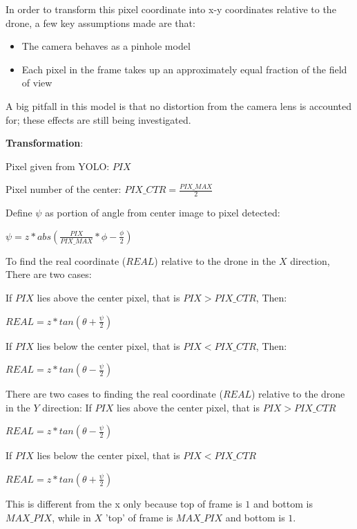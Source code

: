 \documentclass[12pt,letterpaper]{article}
\newcommand\tab[1][1cm]{\hspace*{#1}}
\begin{document}
			\begin{spacing}{.2}
			In order to transform this pixel coordinate into x-y coordinates relative to the drone, a few key assumptions made are that:

				\begin{itemize}
					\item The camera behaves as a pinhole model
					\item Each pixel in the frame takes up an approximately equal fraction of the field of view
				\end{itemize}

			A big pitfall in this model is that no distortion from the camera lens is accounted for; these effects are still being investigated.

				\textbf{Transformation}:

				Pixel given from YOLO: $PIX$ 


				\begin{center}
					Pixel number of the center: $PIX\_CTR = \frac{PIX\_MAX}{2}$
				\end{center}

				Define $\psi$ as portion of angle from center image to pixel detected:

				\begin{center}
					$\psi = z * abs(\frac{PIX}{PIX\_MAX} * \phi - \frac{\phi}{2})$
				\end{center}

				To find the real coordinate ($REAL$) relative to the drone in the $X$ direction, There are two cases:

						\tab If $PIX$ lies above the center pixel, that is $PIX > PIX\_CTR$, Then:
						\begin{center}
							$REAL = z * tan(\theta + \frac{\psi}{2})$
						\end{center}
						\tab If $PIX$ lies below the center pixel, that is $PIX < PIX\_CTR$, Then:
						\begin{center}
							$REAL = z * tan(\theta - \frac{\psi}{2})$
						\end{center}
				There are two cases to finding the real coordinate ($REAL$) relative to the drone in the $Y$ direction:
						\tab If $PIX$ lies above the center pixel, that is $PIX > PIX\_CTR$
						\begin{center}
							$REAL = z * tan(\theta - \frac{\psi}{2})$
						\end{center}
						\tab If $PIX$ lies below the center pixel, that is $PIX < PIX\_CTR$
						\begin{center}
							$REAL = z * tan(\theta + \frac{\psi}{2})$
						\end{center}
				This is different from the x only because top of frame is $1$ and bottom is $MAX\_PIX$, while in $X$ 'top' of frame is $MAX\_PIX$ and bottom is $1$.
			\end{spacing}
\end{document}
